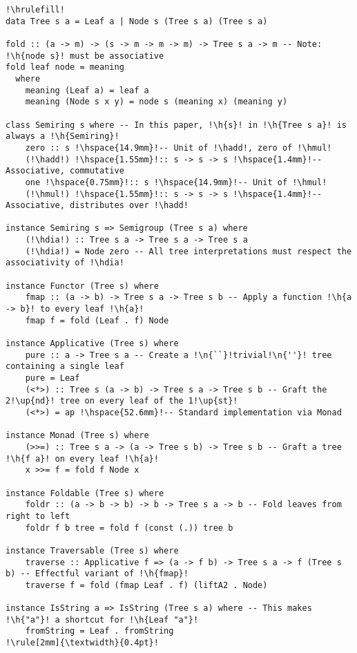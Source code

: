\documentclass[english,submission]{programming}
\newcommand{\code}[1]{\lstinline[mathescape]|#1|}
\newcommand{\h}[1]{{\itshape\color{grayblue}#1}} %
\newcommand{\n}[1]{{\itshape\color{graygreen}#1}} %
\newcommand{\up}[1]{{\itshape\color{graygreen}\textsuperscript{#1}}}
\newcommand{\hadd}{{\large\color{darkblue} $\oplus$}}
\newcommand{\hmul}{{\large\color{darkblue} $\otimes$}}
\newcommand{\hdia}{\,\text{\raisebox{-0.2mm}{\Large\color{darkblue} $\diamond$}}\,}
\begin{document}
\begin{lstlisting}[float,label=lst-tree-std,xleftmargin=0pt,caption={
    The \code{Tree} data type and instances of various standard Haskell type classes.
}]
!\hrulefill!
data Tree s a = Leaf a | Node s (Tree s a) (Tree s a)

fold :: (a -> m) -> (s -> m -> m -> m) -> Tree s a -> m -- Note: !\h{node s}! must be associative
fold leaf node = meaning
  where
    meaning (Leaf a) = leaf a
    meaning (Node s x y) = node s (meaning x) (meaning y)

class Semiring s where -- In this paper, !\h{s}! in !\h{Tree s a}! is always a !\h{Semiring}!
    zero :: s !\hspace{14.9mm}!-- Unit of !\hadd!, zero of !\hmul!
    (!\hadd!) !\hspace{1.55mm}!:: s -> s -> s !\hspace{1.4mm}!-- Associative, commutative
    one !\hspace{0.75mm}!:: s !\hspace{14.9mm}!-- Unit of !\hmul!
    (!\hmul!) !\hspace{1.55mm}!:: s -> s -> s !\hspace{1.4mm}!-- Associative, distributes over !\hadd!

instance Semiring s => Semigroup (Tree s a) where
    (!\hdia!) :: Tree s a -> Tree s a -> Tree s a
    (!\hdia!) = Node zero -- All tree interpretations must respect the associativity of !\hdia!

instance Functor (Tree s) where
    fmap :: (a -> b) -> Tree s a -> Tree s b -- Apply a function !\h{a -> b}! to every leaf !\h{a}!
    fmap f = fold (Leaf . f) Node

instance Applicative (Tree s) where
    pure :: a -> Tree s a -- Create a !\n{``}!trivial!\n{''}! tree containing a single leaf
    pure = Leaf
    (<*>) :: Tree s (a -> b) -> Tree s a -> Tree s b -- Graft the 2!\up{nd}! tree on every leaf of the 1!\up{st}!
    (<*>) = ap !\hspace{52.6mm}!-- Standard implementation via Monad

instance Monad (Tree s) where
    (>>=) :: Tree s a -> (a -> Tree s b) -> Tree s b -- Graft a tree !\h{f a}! on every leaf !\h{a}!
    x >>= f = fold f Node x

instance Foldable (Tree s) where
    foldr :: (a -> b -> b) -> b -> Tree s a -> b -- Fold leaves from right to left
    foldr f b tree = fold f (const (.)) tree b

instance Traversable (Tree s) where
    traverse :: Applicative f => (a -> f b) -> Tree s a -> f (Tree s b) -- Effectful variant of !\h{fmap}!
    traverse f = fold (fmap Leaf . f) (liftA2 . Node)

instance IsString a => IsString (Tree s a) where -- This makes !\h{"a"}! a shortcut for !\h{Leaf "a"}!
    fromString = Leaf . fromString
!\rule[2mm]{\textwidth}{0.4pt}!
\end{lstlisting}
\end{document}
